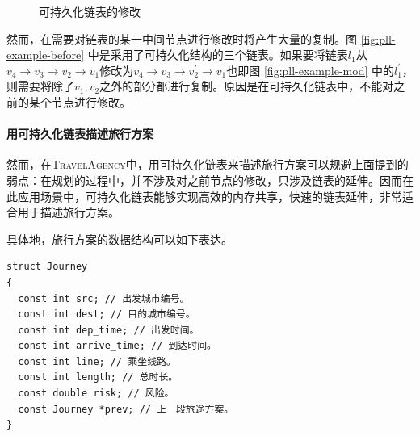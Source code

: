 \begin{figure}[t]
	\centering
	\caption{可持久化链表的修改}
	\label{fig:pll-example}
\end{figure}

然而，在需要对链表的某一中间节点进行修改时将产生大量的复制。图 \ref{fig:pll-example-before} 中是采用了可持久化结构的三个链表。如果要将链表$l_1$从$v_4 \rightarrow v_3 \rightarrow v_2 \rightarrow v_1$修改为$v_4 \rightarrow v_3 \rightarrow v_2^\prime \rightarrow v_1$也即图 \ref{fig:pll-example-mod} 中的$l_1^\prime$，则需要将除了$v_1, v_2$之外的部分都进行复制。原因是在可持久化链表中，不能对之前的某个节点进行修改。

\paragraph{用可持久化链表描述旅行方案}

然而，在\textsc{TravelAgency}中，用可持久化链表来描述旅行方案可以规避上面提到的弱点：在规划的过程中，并不涉及对之前节点的修改，只涉及链表的延伸。因而在此应用场景中，可持久化链表能够实现高效的内存共享，快速的链表延伸，非常适合用于描述旅行方案。

具体地，旅行方案的数据结构可以如下表达。

\begin{lstlisting}[caption={旅行方案数据结构}]
struct Journey
{
  const int src; // 出发城市编号。
  const int dest; // 目的城市编号。
  const int dep_time; // 出发时间。
  const int arrive_time; // 到达时间。
  const int line; // 乘坐线路。
  const int length; // 总时长。
  const double risk; // 风险。
  const Journey *prev; // 上一段旅途方案。
}
\end{lstlisting}

